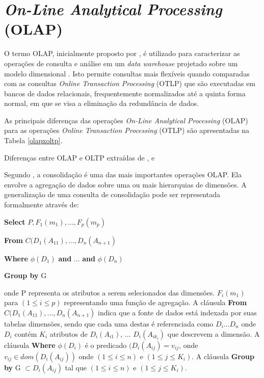 \section{\textit{On-Line Analytical Processing} (OLAP)}

O termo OLAP, inicialmente proposto por , é utilizado para caracterizar as operações de consulta e análise em um \textit{data warehouse} projetado sobre um modelo dimensional \cite{Kimball2002}. Isto permite consultas mais flexíveis quando comparadas com as consultas \textit{Online Transaction Processing} (OTLP) que são executadas em bancos de dados relacionais, frequentemente normalizados até a quinta forma normal, em que se visa a eliminação da redundância de dados.

As principais diferenças das operações \textit{On-Line Analytical Processing} (OLAP) para as operações 
\textit{Online Transaction Processing} (OTLP) são apresentadas na Tabela 
\ref{olapxoltp}.

	\begin{table}[!ht]
	\begin{center}

	
	
	\caption{Diferenças entre OLAP e OLTP extraídas de ,  e }
	\label{olapxoltp}
	\end{center}
	\end{table}
	\FloatBarrier

Segundo , a consolidação é uma das mais importantes operações OLAP. Ela envolve a agregação de dados sobre uma ou mais hierarquias de dimensões. A generalização de uma consulta de consolidação pode ser representada formalmente através de: 

\textbf{Select} $\displaystyle P,F_{1}(m_1),..., F_p(m_p)$

\textbf{From} $\displaystyle C(D_1(A_{11}),...,D_n(A_{n+1})$

\textbf{Where} $\displaystyle \phi(D_1)$ \textbf{and} ... \textbf{and}  $\displaystyle\phi(D_n)$

\textbf{Group by} G

onde P representa os atributos a serem selecionados das dimensões. $\displaystyle F_{i}(m_1)$ para $\displaystyle (1 \leq i \leq p) $ representando uma função de agregação. A cláusula \textbf{From} $\displaystyle C(D_1(A_{11}),...,D_n(A_{n+1})$ indica que a fonte de dados está indexada por suas tabelas dimensões, sendo que cada uma destas é referenciada como $\displaystyle D_i ... D_n $ onde  $\displaystyle D_i $ contém  $\displaystyle K_i$ atributos de  $\displaystyle D_i(A_{i1})$, ... $ \displaystyle D_i(A_{ik_{i}}) $ que descrevem a dimensão.  A cláusula \textbf{Where} $\displaystyle \phi(D_i)$ é o predicado $\displaystyle (D_i(A_{ij}) = v_{ij}$, onde $\displaystyle v_{ij} \in dom(D_i(A_{ij}))$ onde $\displaystyle (1 \leq i \leq n) $ e $\displaystyle (1 \leq j \leq K_{i}) $. A cláusula \textbf{Group by} G $\displaystyle \subset {D_{i}(A_{ij})} $ tal que $\displaystyle (1 \leq i \leq n) $ e $\displaystyle (1 \leq j \leq K_{i})$.


